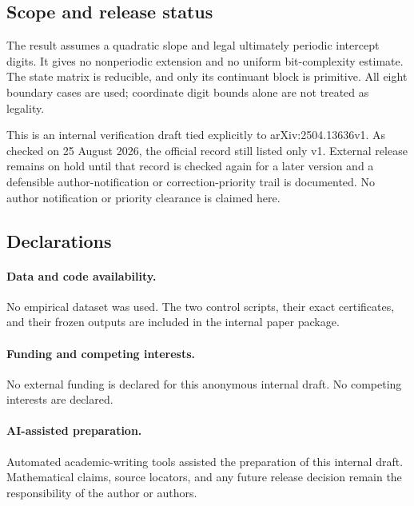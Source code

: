 \subsection*{Scope and release status}

The result assumes a quadratic slope and legal ultimately periodic intercept
digits.  It gives no nonperiodic extension and no uniform bit-complexity
estimate.  The state matrix is reducible, and only its continuant block is
primitive.  All eight boundary cases are used; coordinate digit bounds alone
are not treated as legality.

This is an internal verification draft tied explicitly to
arXiv:2504.13636v1.  As checked on 25 August 2026, the official record still
listed only v1.  External release remains on hold until that record is checked
again for a later version and a defensible author-notification or
correction-priority trail is documented.  No author notification or priority
clearance is claimed here.

\subsection*{Declarations}

\paragraph{Data and code availability.}
No empirical dataset was used.  The two control scripts, their exact
certificates, and their frozen outputs are included in the internal paper
package.

\paragraph{Funding and competing interests.}
No external funding is declared for this anonymous internal draft.  No
competing interests are declared.

\paragraph{AI-assisted preparation.}
Automated academic-writing tools assisted the preparation of this internal
draft.  Mathematical claims, source locators, and any future release decision
remain the responsibility of the author or authors.
